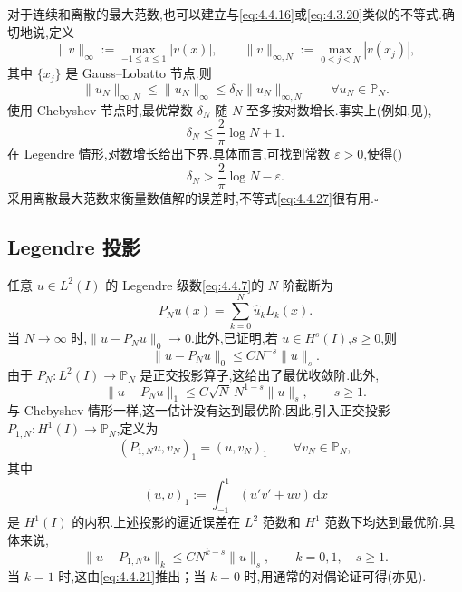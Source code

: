 \begin{note}
对于连续和离散的最大范数,也可以建立与\eqref{eq:4.4.16}或\eqref{eq:4.3.20}类似的不等式.确切地说,定义
\begin{equation}\label{eq:4.4.26}
  \|v\|_\infty:=\max_{-1\le x\le1}|v(x)|,\qquad
  \|v\|_{\infty,N}:=\max_{0\le j\le N}|v(x_j)|,
\end{equation}
其中 \(\{x_j\}\) 是 Gauss--Lobatto 节点.则
\begin{equation}\label{eq:4.4.27}
  \|u_N\|_{\infty,N}\le\|u_N\|_\infty\le\delta_N\|u_N\|_{\infty,N}
    \qquad\forall u_N\in\mathbb P_N.
\end{equation}
使用 Chebyshev 节点时,最优常数 \(\delta_N\) 随 \(N\) 至多按对数增长.事实上(例如,见),
\[
  \delta_N\le\frac2\pi\log N+1.
\]
在 Legendre 情形,对数增长给出下界.具体而言,可找到常数 \(\varepsilon>0\),使得()
\[
  \delta_N>\frac2\pi\log N-\varepsilon.
\]
采用离散最大范数来衡量数值解的误差时,不等式\eqref{eq:4.4.27}很有用.\hfill\(\square\)
\end{note}

\subsection{Legendre 投影}\label{sec:4.4.3}

任意 \(u\in L^2(I)\) 的 Legendre 级数\eqref{eq:4.4.7}的 \(N\) 阶截断为
\begin{equation}\label{eq:4.4.28}
  P_Nu(x)=\sum_{k=0}^N\widehat u_k L_k(x).
\end{equation}
当 \(N\to\infty\) 时,\(\|u-P_Nu\|_0\to0\).此外,已证明,若 \(u\in H^s(I)\),\(s\ge0\),则
\begin{equation}\label{eq:4.4.29}
  \|u-P_Nu\|_0\le CN^{-s}\|u\|_s.
\end{equation}
由于 \(P_N\colon L^2(I)\to\mathbb P_N\) 是正交投影算子,这给出了最优收敛阶.此外,
\begin{equation}\label{eq:4.4.30}
  \|u-P_Nu\|_1\le C\sqrt N\,N^{1-s}\|u\|_s,\qquad s\ge1.
\end{equation}
与 Chebyshev 情形一样,这一估计没有达到最优阶.因此,引入正交投影 \(P_{1,N}\colon H^1(I)\to\mathbb P_N\),定义为
\begin{equation}\label{eq:4.4.31}
  (P_{1,N}u,v_N)_1=(u,v_N)_1\qquad\forall v_N\in\mathbb P_N,
\end{equation}
其中
\begin{equation}\label{eq:4.4.32}
  (u,v)_1:=\int_{-1}^1(u'v'+uv)\,\mathrm dx
\end{equation}
是 \(H^1(I)\) 的内积.上述投影的逼近误差在 \(L^2\) 范数和 \(H^1\) 范数下均达到最优阶.具体来说,
\begin{equation}\label{eq:4.4.33}
  \|u-P_{1,N}u\|_k\le CN^{k-s}\|u\|_s,\qquad k=0,1,\quad s\ge1.
\end{equation}
当 \(k=1\) 时,这由\eqref{eq:4.4.21}推出；当 \(k=0\) 时,用通常的对偶论证可得(亦见).

